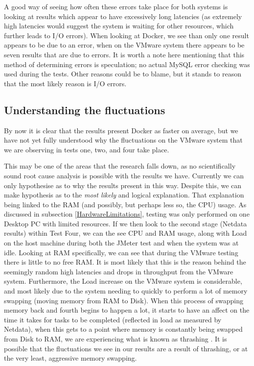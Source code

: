 A good way of seeing how often these errors take place for both systems is looking at results which appear to have excessively long latencies (as extremely high latencies would suggest the system is waiting for other resources, which further leads to I/O errors). When looking at Docker, we see than only one result appears to be due to an error, when on the VMware system there appears to be seven results that are due to errors. It is worth a note here mentioning that this method of determining errors is speculation; no actual MySQL error checking was used during the tests. Other reasons could be to blame, but it stands to reason that the most likely reason is I/O errors.

\subsection{Understanding the fluctuations}
By now it is clear that the results present Docker as faster on average, but we have not yet fully understood why the fluctuations on the VMware system that we are observing in tests one, two, and four take place.

This may be one of the areas that the research falls down, as no scientifically sound root cause analysis is possible with the results we have. Currently we can only hypothesise as to why the results present in this way. Despite this, we can make hypothesis as to the \emph{most likely} and logical explanation. That explanation being linked to the RAM (and possibly, but perhaps less so, the CPU) usage. As discussed in subsection \ref{HardwareLimitations}, testing was only performed on one Desktop PC with limited resources. If we then look to the second stage (Netdata results) within Test Four, we can the see CPU and RAM usage, along with Load on the host machine during both the JMeter test and when the system was at idle. Looking at RAM specifically, we can see that during the VMware testing there is little to no free RAM. It is most likely that this is the reason behind the seemingly random high latencies and drops in throughput from the VMware system. Furthermore, the Load increase on the VMware system is considerable, and most likely due to the system needing to quickly to perform a lot of memory swapping (moving memory from RAM to Disk). When this process of swapping memory back and fourth begins to happen a lot, it starts to have an affect on the time it takes for tasks to be completed (reflected in load as measured by Netdata), when this gets to a point where memory is constantly being swapped from Disk to RAM, we are experiencing what is known as thrashing \citep{thrashing}. It is possible that the fluctuations we see in our results are a result of thrashing, or at the very least, aggressive memory swapping.

